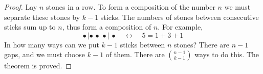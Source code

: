 

\setcounter{section}{3}
\setcounter{subsection}{5}
\setcounter{dfn}{10}

\begin{proof}
Lay $n$ stones in a row.
To form a composition of the number $n$ we must separate these stones by $k-1$ sticks.
The numbers of stones between consecutive sticks sum up to $n$, thus form a composition of $n$.
For example,
\[
\bullet\, | \bullet\, \bullet\, \bullet |\, \bullet \quad \longleftrightarrow \quad 5 = 1+3+1
\]
In how many ways can we put $k-1$ sticks between $n$ stones?
There are $n-1$ gaps, and we must choose $k-1$ of them.
There are $\binom{n-1}{k-1}$ ways to do this. The theorem is proved.
\end{proof}


